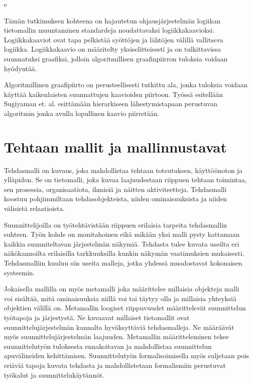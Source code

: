 e	\documentclass[finnish,12pt]{article}
\begin{document}
Tämän tutkimuksen kohteena on hajautetun ohjausjärjestelmän logiikan
tietomallin muuntaminen standardeja noudattavaksi logiikkakaavioksi.
Logiikkakaaviot ovat tapa pelkistää syöttöjen ja lähtöjen välillä vallitseva
logiikka. Logiikkakaavio on määritelty yksiselitteisesti ja on tulkittavissa
suunnatuksi graafiksi, jolloin algoritmillisen graafinpiirron tuloksia voidaan
hyödyntää.

Algoritmillinen graafipiirto on perusteellisesti tutkittu ala, jonka tuloksia
voidaan käyttää kaikenlaisten suunnattujen kaavioiden piirtoon. Työssä esitellään
Sugiyaman et. al. \cite{RefWorks:9} esittämään hierarkiseen lähestymistapaan
perustuvan algoritmin jonka avulla lopullinen kaavio piirretään.



	\clearpage
	\section{Tehtaan mallit ja mallinnustavat}

Tehdasmalli on kuvaus, joka mahdollistaa tehtaan toteutuksen, käyttöönoton ja
ylläpidon. Se on tietomalli, joka kuvaa laajuudestaan riippuen tehtaan toimintaa,
sen prosessia, organisaatiota, ihmisiä ja näitten aktiviteetteja. Tehdasmalli
koostuu pohjimmiltaan tehdasobjekteista, niiden ominaisuuksista ja niiden
välisistä relaatioista. \cite{RefWorks:41}

Suunnittelijoilla on työtehtävistään riippuen erilaisia tarpeita tehdasmallin
suhteen. Työn kohde on monitahoinen eikä mikään yksi malli pysty kattamaan
kaikkia suunniteltavan järjestelmän näkymiä. Tehdasta tulee kuvata useilta eri
näkökannoilta erilaisilla tarkkuuksilla kunkin näkymän vaatimuksien mukaisesti.
Tehdasmalliin kuuluu siis useita malleja, jotka yhdessä muodostavat kokonaisen
systeemin.

Jokaisella mallilla on myös metamalli joka määrittelee millaisia objekteja malli
voi sisältää, mitä ominaisuuksia niillä voi tai täytyy olla ja millaisia
yhteyksiä objektien välillä on. Metamallin loogiset riippuvuudet määrittelevät
suunnittelun työtapoja ja järjestystä. Ne kuvaavat millaiset tietomallit ovat
suunnittelujärjestelmän kannalta hyväksyttäviä tehdasmalleja. Ne määräävät myös
suunnittelujärjestelmän laajuuden. Metamallin määritteleminen tekee
suunnittelutyön tuloksesta ennakoitavan ja mahdollistaa suunnittelun
apuvälineiden kehittämisen. Suunnittelutyön formalisoimisella myös suljetaan
pois eriäviä tapoja kuvata tehdasta ja mahdollistetaan formalismiin perustuvat
työkalut ja suunnittelukäytännöt. 
\end{document}
